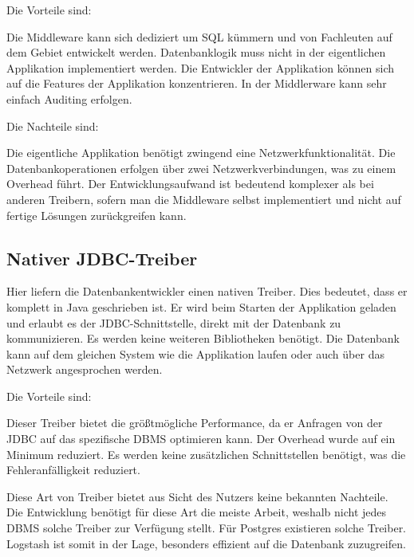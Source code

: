 Die Vorteile sind:

\begin{outline}
  \1 Die Middleware kann sich dediziert um SQL kümmern und von Fachleuten auf
  dem Gebiet entwickelt werden.
  \1 Datenbanklogik muss nicht in der eigentlichen Applikation implementiert
  werden. Die Entwickler der Applikation können sich auf die Features der
  Applikation konzentrieren.
  \1 In der Middlerware kann sehr einfach Auditing erfolgen.
\end{outline}

Die Nachteile sind:

\begin{outline}
  \1 Die eigentliche Applikation benötigt zwingend eine Netzwerkfunktionalität.
  \1 Die Datenbankoperationen erfolgen über zwei Netzwerkverbindungen, was
  zu einem Overhead führt.
  \1 Der Entwicklungsaufwand ist bedeutend komplexer als bei anderen Treibern,
  sofern man die Middleware selbst implementiert und nicht auf fertige Lösungen
  zurückgreifen kann.
\end{outline}

\subsection{Nativer JDBC-Treiber}
Hier liefern die Datenbankentwickler einen nativen Treiber. Dies bedeutet, dass
er komplett in Java geschrieben ist. Er wird beim Starten der Applikation
geladen und erlaubt es der JDBC-Schnittstelle, direkt mit der Datenbank zu
kommunizieren. Es werden keine weiteren Bibliotheken benötigt. Die Datenbank
kann auf dem gleichen System wie die Applikation laufen oder auch über das
Netzwerk angesprochen werden.

Die Vorteile sind:

\begin{outline}
  \1 Dieser Treiber bietet die größtmögliche Performance, da er Anfragen von
  der JDBC auf das spezifische DBMS optimieren kann.
  \1 Der Overhead wurde auf ein Minimum reduziert.
  \1 Es werden keine zusätzlichen Schnittstellen benötigt, was die
  Fehleranfälligkeit reduziert.
\end{outline}

Diese Art von Treiber bietet aus Sicht des Nutzers keine bekannten Nachteile.
Die Entwicklung benötigt für diese Art die meiste Arbeit, weshalb nicht jedes
DBMS solche Treiber zur Verfügung stellt. Für Postgres existieren solche
Treiber. Logstash ist somit in der Lage, besonders effizient auf die Datenbank
zuzugreifen.
\tm%

